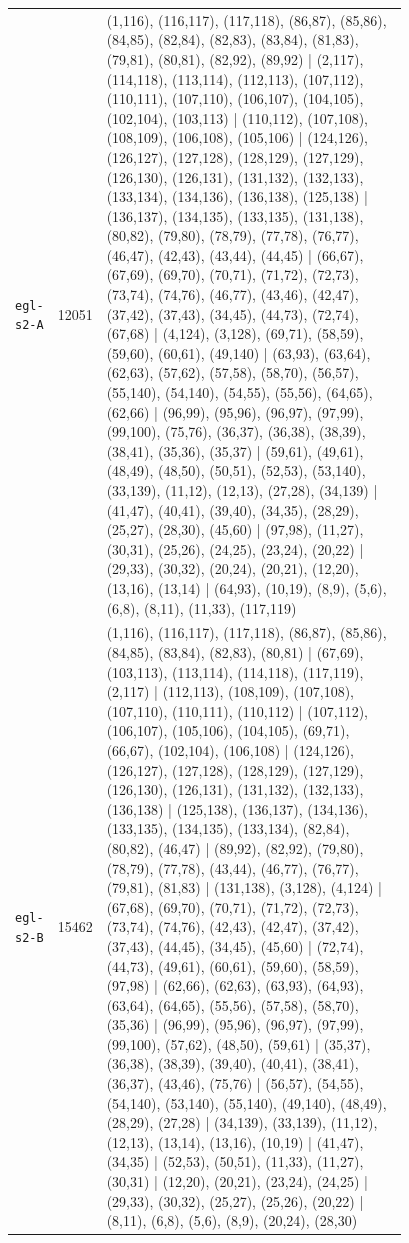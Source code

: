 \begin{landscape}
\begin{longtable}{lr>{\tiny\raggedright\arraybackslash}p{0.78\linewidth}}
\texttt{egl-s2-A} & 12051 & (1,116), (116,117), (117,118), (86,87), (85,86), (84,85), (82,84), (82,83), (83,84), (81,83), (79,81), (80,81), (82,92), (89,92) | (2,117), (114,118), (113,114), (112,113), (107,112), (110,111), (107,110), (106,107), (104,105), (102,104), (103,113) | (110,112), (107,108), (108,109), (106,108), (105,106) | (124,126), (126,127), (127,128), (128,129), (127,129), (126,130), (126,131), (131,132), (132,133), (133,134), (134,136), (136,138), (125,138) | (136,137), (134,135), (133,135), (131,138), (80,82), (79,80), (78,79), (77,78), (76,77), (46,47), (42,43), (43,44), (44,45) | (66,67), (67,69), (69,70), (70,71), (71,72), (72,73), (73,74), (74,76), (46,77), (43,46), (42,47), (37,42), (37,43), (34,45), (44,73), (72,74), (67,68) | (4,124), (3,128), (69,71), (58,59), (59,60), (60,61), (49,140) | (63,93), (63,64), (62,63), (57,62), (57,58), (58,70), (56,57), (55,140), (54,140), (54,55), (55,56), (64,65), (62,66) | (96,99), (95,96), (96,97), (97,99), (99,100), (75,76), (36,37), (36,38), (38,39), (38,41), (35,36), (35,37) | (59,61), (49,61), (48,49), (48,50), (50,51), (52,53), (53,140), (33,139), (11,12), (12,13), (27,28), (34,139) | (41,47), (40,41), (39,40), (34,35), (28,29), (25,27), (28,30), (45,60) | (97,98), (11,27), (30,31), (25,26), (24,25), (23,24), (20,22) | (29,33), (30,32), (20,24), (20,21), (12,20), (13,16), (13,14) | (64,93), (10,19), (8,9), (5,6), (6,8), (8,11), (11,33), (117,119) \\[2pt]
\texttt{egl-s2-B} & 15462 & (1,116), (116,117), (117,118), (86,87), (85,86), (84,85), (83,84), (82,83), (80,81) | (67,69), (103,113), (113,114), (114,118), (117,119), (2,117) | (112,113), (108,109), (107,108), (107,110), (110,111), (110,112) | (107,112), (106,107), (105,106), (104,105), (69,71), (66,67), (102,104), (106,108) | (124,126), (126,127), (127,128), (128,129), (127,129), (126,130), (126,131), (131,132), (132,133), (136,138) | (125,138), (136,137), (134,136), (133,135), (134,135), (133,134), (82,84), (80,82), (46,47) | (89,92), (82,92), (79,80), (78,79), (77,78), (43,44), (46,77), (76,77), (79,81), (81,83) | (131,138), (3,128), (4,124) | (67,68), (69,70), (70,71), (71,72), (72,73), (73,74), (74,76), (42,43), (42,47), (37,42), (37,43), (44,45), (34,45), (45,60) | (72,74), (44,73), (49,61), (60,61), (59,60), (58,59), (97,98) | (62,66), (62,63), (63,93), (64,93), (63,64), (64,65), (55,56), (57,58), (58,70), (35,36) | (96,99), (95,96), (96,97), (97,99), (99,100), (57,62), (48,50), (59,61) | (35,37), (36,38), (38,39), (39,40), (40,41), (38,41), (36,37), (43,46), (75,76) | (56,57), (54,55), (54,140), (53,140), (55,140), (49,140), (48,49), (28,29), (27,28) | (34,139), (33,139), (11,12), (12,13), (13,14), (13,16), (10,19) | (41,47), (34,35) | (52,53), (50,51), (11,33), (11,27), (30,31) | (12,20), (20,21), (23,24), (24,25) | (29,33), (30,32), (25,27), (25,26), (20,22) | (8,11), (6,8), (5,6), (8,9), (20,24), (28,30) \\[2pt]

\end{longtable}
\end{landscape}
